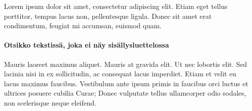 Lorem ipsum dolor sit amet, consectetur adipiscing elit. Etiam eget tellus porttitor, tempus lacus non, pellentesque ligula. Donec sit amet erat condimentum, feugiat mi accumsan, euismod quam.

\paragraph{Otsikko tekstissä, joka ei näy sisällysluettelossa}Mauris laoreet maximus aliquet. Mauris at gravida elit. Ut nec lobortis elit. Sed lacinia nisi in ex sollicitudin, ac consequat lacus imperdiet. Etiam et velit eu lacus maximus faucibus. Vestibulum ante ipsum primis in faucibus orci luctus et ultrices posuere cubilia Curae; Donec vulputate tellus ullamcorper odio sodales, non scelerisque neque eleifend. 